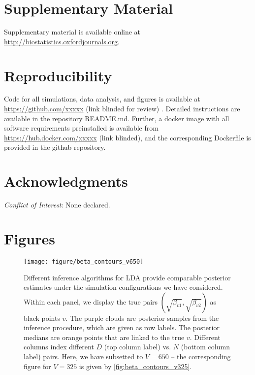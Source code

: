 \documentclass[oupdraft]{bio}
\begin{document}
\section{Supplementary Material}

Supplementary material is available online at
\url{http://biostatistics.oxfordjournals.org}.

\section{Reproducibility}

Code for all simulations, data analysis, and figures is available at
\url{https://github.com/xxxxx} (link blinded for review) . Detailed instructions
are available in the repository README.md. Further, a docker image with all
software requirements preinstalled is available from
\url{https://hub.docker.com/xxxxx} (link blinded), and the corresponding
Dockerfile is provided in the github repository.

\section*{Acknowledgments}


{\it Conflict of Interest}: None declared.




\section{Figures}

\begin{figure}[!p]
  \centering\texttt{[image: figure/beta\_contours\_v650]}
  \caption{Different inference algorithms for LDA provide comparable posterior
    estimates under the simulation configurations we have considered. Within
    each panel, we display the true pairs $\left(\sqrt{\beta_{v1}},
    \sqrt{\beta_{v2}}\right)$ as black points $v$. The purple clouds are
    posterior samples from the inference procedure, which are given as row
    labels. The posterior medians are orange points that are linked to the true
    $v$. Different columns index different $D$ (top column label) vs. $N$
    (bottom column label) pairs. Here, we have subsetted to $V = 650$ -- the
    corresponding figure for $V = 325$ is given by \ref{fig:beta_contours_v325}.
  }
  \label{fig:beta_contours_v650}
\end{figure}
\end{document}
